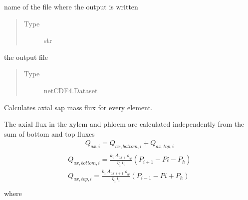 \documentclass[letterpaper,10pt,english]{sphinxmanual}
\begin{document}
\begin{fulllineitems}
\begin{fulllineitems}
\end{fulllineitems}


\begin{fulllineitems}
\label{\detokenize{index:src.model.Model.outputfile}}
name of the file where the output is written
\begin{quote}\begin{description}
\item[{Type}] \leavevmode
str

\end{description}\end{quote}

\end{fulllineitems}


\begin{fulllineitems}
\label{\detokenize{index:src.model.Model.ncf}}
the output file
\begin{quote}\begin{description}
\item[{Type}] \leavevmode
netCDF4.Dataset

\end{description}\end{quote}

\end{fulllineitems}


\begin{fulllineitems}
\label{\detokenize{index:src.model.Model.axial_fluxes}}
Calculates axial sap mass flux for every element.

The axial flux in the xylem and phloem are calculated independently from the sum of bottom and top fluxes
\begin{equation*}
\begin{split}Q_{ax,i} = Q_{ax,bottom,i} + Q_{ax,top,i}\end{split}
\end{equation*}\begin{align*}\!\begin{aligned}
Q_{ax,bottom,i} = \frac{k_i \: A_{ax,i} \: \rho_w}{\eta_i \: l_i}(P_{i+1} - P{i} - P_h)\\
Q_{ax,top,i} = \frac{k_i \: A_{ax,i+1} \: \rho_w}{\eta_i \: l_i}(P_{i-1} - P{i} + P_h)\\
\end{aligned}\end{align*}
where


\end{fulllineitems}
\end{fulllineitems}
\end{document}
